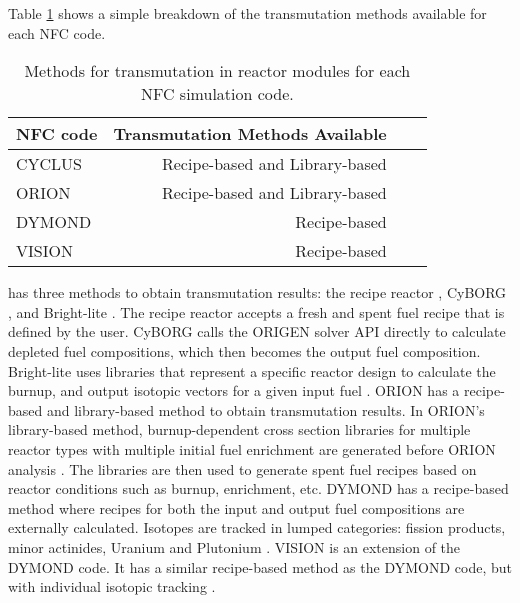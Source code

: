 

Table \ref{tab:nfcs} shows a simple breakdown of the 
transmutation methods available for each \gls{NFC} code. 

\begin{table}[h]
    \centering
    \begin{tabular}{lrrr}
        \hline
        \gls{NFC} code & Transmutation Methods Available \\
        \hline
        CYCLUS \cite{huff_fundamental_2016}& Recipe-based and Library-based\\
        ORION \cite{gregg_analysis_2012}& Recipe-based and Library-based\\
        DYMOND \cite{yacout_modeling_2005}& Recipe-based  \\
        VISION \cite{jacobson_verifiable_2010}& Recipe-based  \\
        \hline
    \end{tabular}
    \caption{Methods for transmutation in reactor modules
             for each \gls{NFC} simulation code. 
             \label{tab:nfcs}}
\end{table}

\Cyclus has three methods to obtain transmutation results: the \Cycamore 
recipe reactor \cite{huff_extensions_2014}, CyBORG 
\cite{skutnik_cyborg_2016}, and Bright-lite \cite{flanagan_brightlite_2014}.  
The \Cycamore recipe reactor accepts a fresh and spent fuel recipe that is 
defined by the user. 
CyBORG calls the \gls{ORIGEN} solver \gls{API} directly to calculate depleted fuel
compositions, which then becomes the output fuel composition.
Bright-lite uses libraries that represent a specific reactor design to 
calculate the burnup, and output isotopic vectors for a given input fuel
\cite{flanagan_brightlite_2014}. 
ORION has a recipe-based and library-based method to obtain transmutation results. 
In ORION's library-based method, burnup-dependent cross section libraries 
for multiple reactor types with multiple initial fuel enrichment are 
generated before ORION analysis \cite{sunny_transition_2015}. 
The libraries are then used to generate spent fuel recipes based on 
reactor conditions such as burnup, enrichment, etc.  
DYMOND has a recipe-based method where recipes for both the input 
and output fuel compositions are externally calculated. 
Isotopes are tracked in lumped categories: fission products, minor 
actinides, Uranium and Plutonium \cite{feng_standardized_2016}.  
VISION is an extension of the DYMOND code. 
It has a similar recipe-based method as the DYMOND code, but with individual isotopic 
tracking \cite{yacout_vision_2006}. 


